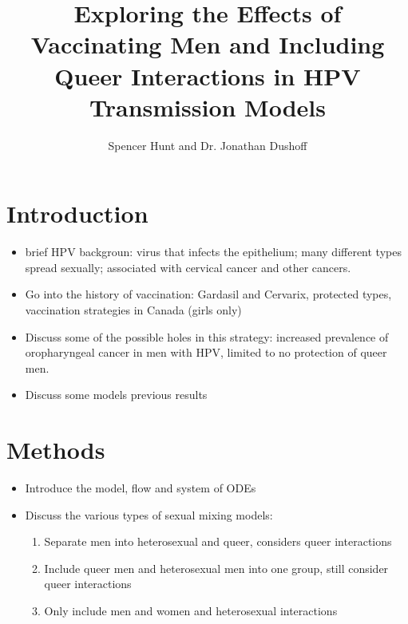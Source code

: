 \documentclass[12pt]{article}
\title{Exploring the Effects of Vaccinating Men and Including Queer Interactions in HPV Transmission Models}
\author{Spencer Hunt and Dr. Jonathan Dushoff}
\begin{document}
\maketitle

\section{Introduction}
\begin{itemize}
\item brief HPV backgroun: virus that infects the epithelium; many different types spread sexually; associated with cervical cancer and other cancers.
\item Go into the history of vaccination: Gardasil and Cervarix, protected types, vaccination strategies in Canada (girls only)
\item Discuss some of the possible holes in this strategy: increased prevalence of oropharyngeal cancer in men with HPV, limited to no protection of queer men. 
\item Discuss some models previous results
\end{itemize}

\section{Methods}
\begin{itemize}
\item Introduce the model, flow and system of ODEs
\item Discuss the various types of sexual mixing models:
	\begin{enumerate}
	\item Separate men into heterosexual and queer, considers queer interactions
	\item Include queer men and heterosexual men into one group, still consider queer interactions 
	\item Only include men and women and heterosexual interactions
	\end{enumerate}	
\end{itemize}
\end{document}
